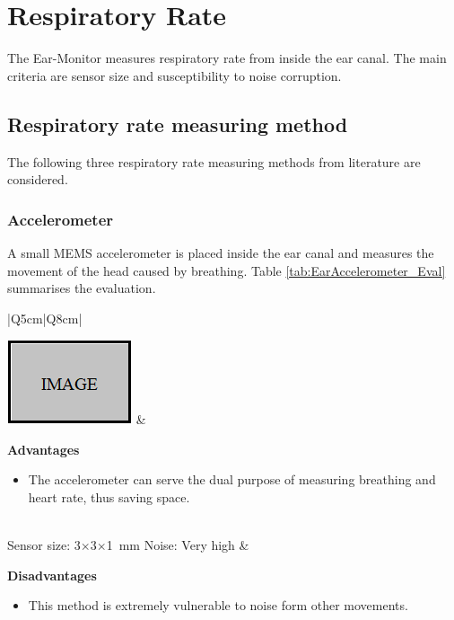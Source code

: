 
\section{Respiratory Rate}
The Ear-Monitor measures respiratory rate from inside the ear canal. The main criteria are sensor size and susceptibility to noise corruption.

\subsection{Respiratory rate measuring method}
The following three respiratory rate measuring methods from literature are considered.

\subsubsection{Accelerometer}
A small MEMS accelerometer is placed inside the ear canal and measures the movement of the head caused by breathing. Table \ref{tab:EarAccelerometer_Eval} summarises the evaluation.

\begin{table}[H]
\caption{Ear Accelerometer}
\label{tab:EarAccelerometer_Eval}
\renewcommand{\arraystretch}{1.3}
\centering
\begin{tabular}{|Q{5cm}|Q{8cm}|} 
 \hline
 
\includegraphics[scale=0.8]{figs/Image.png} 		& 	

	\textbf{Advantages}
	\begin{itemize}[leftmargin=1em, noitemsep, topsep=2pt]	  
	\item The accelerometer can serve the dual purpose of measuring breathing and heart rate, thus saving space.
	\end{itemize}\\ 
	
\hline
Sensor size: 3$\times$3$\times$\SI{1}{\milli\meter}	\citep{Accelerometer}	\newline
Noise: Very high							&	

	\textbf{Disadvantages}
	\begin{itemize}[leftmargin=1em, noitemsep, topsep=2pt]	  
	\item This method is extremely vulnerable to noise form other movements.
	\end{itemize}\\ 

 \hline
\end{tabular}
\end{table}

